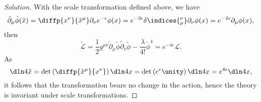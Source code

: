 \begin{proof}[Solution]
   With the scale transformation defined above, we have
   \begin{equation*}
      \tilde{\partial}_{\mu} \tilde{\phi}(\tilde{x}) = \diffp{x^\nu}{\tilde{x}^\mu} \partial_\nu e^{- \epsilon}\phi(x) = e^{-2 \epsilon} \delta\indices{^\nu_\mu} \partial_\nu \phi(x) = e^{-2 \epsilon} \partial_\mu \phi(x),
   \end{equation*}
   then
   \begin{equation*}
      \tilde{\mathcal{L}} = \frac12 g^{\mu \nu} \tilde{\partial}_\mu \tilde{\phi} \tilde{\partial}_\nu \tilde{\phi} - \frac\lambda{4!} \tilde{\phi}^4 = e^{-4\epsilon} \mathcal{L}.
   \end{equation*}
   As 
   \begin{equation*}
      \dln4{\tilde{x}} = \det\left(\diffp{\tilde{x}^\mu}{x^\nu}\right) \dln4x = \det\left(e^{\epsilon} \unity\right) \dln4x = e^{4\epsilon} \dln4x,
   \end{equation*}
   it follows that the transformation bears no change in the action, hence the theory is invariant under scale transformations.


\end{proof}
